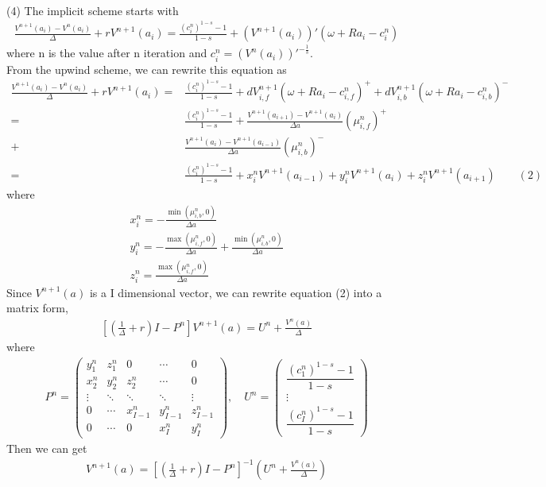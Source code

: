 \documentclass{article}
\begin{document}
\begin{CJK}{UTF8}{min}
\\(4)\quad
The implicit scheme starts with 
\begin{align*}
\frac{V^{n+1}(a_i)-V^n(a_i)}{\Delta }+rV^{n+1}(a_i)=\frac{(c_i^n)^{1-s}-1}{1-s}+(V^{n+1}(a_i))'(\omega+Ra_i-c^n_i)
\end{align*}
where n is the value after n iteration and $c_i^n=(V^n(a_i))'^{-\frac1s}$.\\
From the upwind scheme, we can rewrite this equation as
\begin{align*}
\frac{V^{n+1}(a_i)-V^n(a_i)}{\Delta }+rV^{n+1}(a_i)=&\frac{(c_i^n)^{1-s}-1}{1-s}+dV_{i,f}^{n+1}(\omega+Ra_i-c_{i,f}^n)^++dV_{i,b}^{n+1}(\omega+Ra_i-c_{i,b}^n)^-\\
=&\frac{(c_i^n)^{1-s}-1}{1-s}+\!\frac{V^{n+1}(a_{i+1})-V^{n+1}(a_i)}{\Delta a}(\mu_{i,f}^n)^+\\+&\!\frac{V^{n+1}(a_{i})-V^{n+1}(a_{i-1})}{\Delta a}(\mu_{i,b}^n)^-\\
=&\frac{(c_i^n)^{1-s}-1}{1-s}+x_i^nV^{n+1}(a_{i-1})+y_i^nV^{n+1}(a_i)+z_i^nV^{n+1}(a_{i+1})\qquad(2)
\end{align*}
where
\begin{align*}
x_i^n=-\frac{\min(\mu_{i,b}^n,0)}{\Delta a}\\
y_i^n=-\frac{\max(\mu_{i,f}^n,0)}{\Delta a}+\frac{\min(\mu_{i,b}^n,0)}{\Delta a}\\
z_i^n=\frac{\max(\mu_{i,f}^n,0)}{\Delta a}
\end{align*}
Since $V^{n+1}(a)$ is a I dimensional vector, we can rewrite equation (2) into a matrix form,
\begin{align*}
\left[\left(\frac{1}{\Delta } +r\right)I-P^n\right]V^{n+1}(a)=U^n+\frac{V^n(a)}{\Delta }
\end{align*}
where
\begin{align*}
P^n=\begin{pmatrix}y_1^n&z_1^n&0&\cdots&0\\x_2^n&y_2^n&z_2^n&\cdots&0\\\vdots&\ddots&\ddots&\ddots&\vdots\\0&\cdots&x^n_{I-1}&y^n_{I-1}&z^n_{I-1}\\0&\cdots&0&x^n_I&y^n_I
\end{pmatrix},\quad
U^n=\begin{pmatrix}
\dfrac{(c_1^n)^{1-s}-1}{1-s}\\\vdots\\\dfrac{(c_I^n)^{1-s}-1}{1-s}
\end{pmatrix}
\end{align*}
Then we can get 
\begin{align*}
V^{n+1}(a)=\left[\left(\frac{1}{\Delta } +r\right)I-P^n\right]^{-1}\left(U^n+\frac{V^n(a)}{\Delta }\right)
\end{align*}

\end{CJK}
\end{document}
